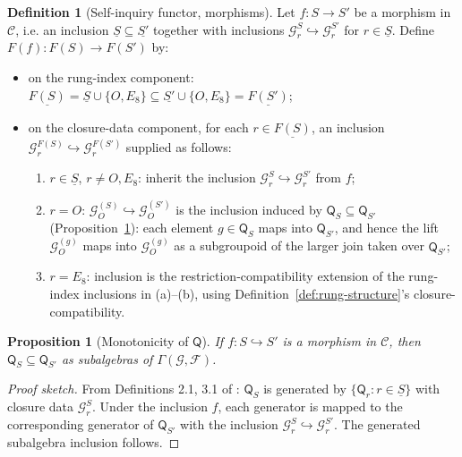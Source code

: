 \documentclass[11pt, a4paper]{amsart}
\newtheorem{proposition}[theorem]{Proposition}
\theoremstyle{definition}
\newtheorem{definition}[theorem]{Definition}
\newcommand{\catC}{\mathcal{C}}
\newcommand{\Fcal}{\mathcal{F}}
\newcommand{\Gcal}{\mathcal{G}}
\newcommand{\Qalg}{\mathsf{Q}}
\begin{document}
\begin{definition}[Self-inquiry functor, morphisms]
\label{def:F-morphisms}
Let $f \colon S \to S'$ be a morphism in $\catC$, i.e. an inclusion
$\underline{S} \subseteq \underline{S'}$ together with inclusions
$\Gcal_r^S \hookrightarrow \Gcal_r^{S'}$ for $r \in \underline{S}$.
Define $F(f) \colon F(S) \to F(S')$ by:
\begin{itemize}
\item on the rung-index component:
  $\underline{F(S)} = \underline{S} \cup \{O, E_8\} \subseteq
  \underline{S'} \cup \{O, E_8\} = \underline{F(S')}$;
\item on the closure-data component, for each $r \in
  \underline{F(S)}$, an inclusion
  $\Gcal_r^{F(S)} \hookrightarrow \Gcal_r^{F(S')}$ supplied as
  follows:
  \begin{enumerate}
  \item $r \in \underline{S}$, $r \ne O, E_8$: inherit the
    inclusion $\Gcal_r^S \hookrightarrow \Gcal_r^{S'}$ from $f$;
  \item $r = O$: $\Gcal_O^{(S)} \hookrightarrow \Gcal_O^{(S')}$ is
    the inclusion induced by $\Qalg_S \subseteq \Qalg_{S'}$
    (Proposition~\ref{prop:Q-monotone}): each element $g \in
    \Qalg_S$ maps into $\Qalg_{S'}$, and hence the lift
    $\Gcal_O^{(g)}$ maps into $\Gcal_O^{(g)}$ as a subgroupoid of
    the larger join taken over $\Qalg_{S'}$;
  \item $r = E_8$: inclusion is the restriction-compatibility
    extension of the rung-index inclusions in (a)--(b), using
    Definition~\ref{def:rung-structure}'s closure-compatibility.
  \end{enumerate}
\end{itemize}
\end{definition}

\begin{proposition}[Monotonicity of $\Qalg$]
\label{prop:Q-monotone}
If $f \colon S \hookrightarrow S'$ is a morphism in $\catC$, then
$\Qalg_S \subseteq \Qalg_{S'}$ as subalgebras of
$\Gamma(\Gcal, \Fcal)$.
\end{proposition}

\begin{proof}[Proof sketch]
From Definitions 2.1, 3.1 of
\cite{CascadeObserverQueryAlgebra}: $\Qalg_S$ is generated by
$\{\Qalg_r : r \in \underline{S}\}$ with closure data
$\Gcal_r^S$. Under the inclusion $f$, each generator is mapped
to the corresponding generator of $\Qalg_{S'}$ with the inclusion
$\Gcal_r^S \hookrightarrow \Gcal_r^{S'}$. The generated subalgebra
inclusion follows.
\end{proof}
\end{document}
